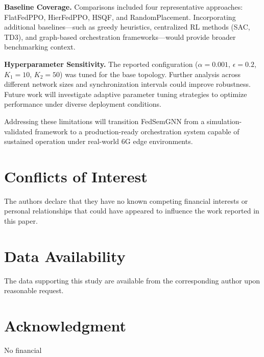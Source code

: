 \documentclass[conference]{IEEEtran}
\begin{document}
	\textbf{Baseline Coverage.}
	Comparisons included four representative approaches: FlatFedPPO, HierFedPPO, HSQF, and RandomPlacement. Incorporating additional baselines—such as greedy heuristics, centralized RL methods (SAC, TD3), and graph-based orchestration frameworks—would provide broader benchmarking context.
	
	\textbf{Hyperparameter Sensitivity.}
	The reported configuration ($\alpha = 0.001$, $\epsilon = 0.2$, $K_1 = 10$, $K_2 = 50$) was tuned for the base topology. Further analysis across different network sizes and synchronization intervals could improve robustness. Future work will investigate adaptive parameter tuning strategies to optimize performance under diverse deployment conditions.
	
	Addressing these limitations will transition FedSemGNN from a simulation-validated framework to a production-ready orchestration system capable of sustained operation under real-world 6G edge environments.
	
	\section*{Conflicts of Interest}
	The authors declare that they have no known competing financial interests or personal relationships that could have appeared to influence the work reported in this paper.
	
	\section*{Data Availability}
	The data supporting this study are available from the corresponding author upon reasonable request.
	
	\section*{Acknowledgment}
	No financial
	
	
	
	
	
	
\end{document}
